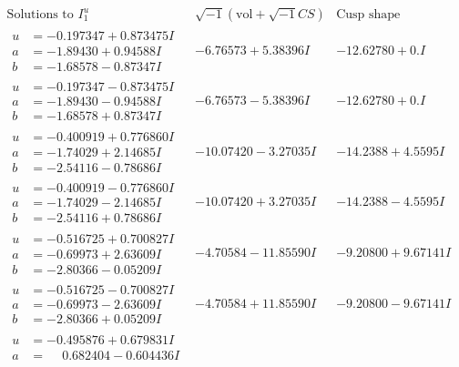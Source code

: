 \documentclass[1p]{elsarticle_modified}
\theoremstyle{definition}
\newcommand{\I}{\sqrt{-1}}
\begin{document}
$$\begin{array}{c|c|c}  
\text{Solutions to }I^u_{1}& \I (\text{vol} + \sqrt{-1}CS) & \text{Cusp shape}\\
 \hline 
\begin{aligned}
u &= -0.197347 + 0.873475 I \\
a &= -1.89430 + 0.94588 I \\
b &= -1.68578 - 0.87347 I\end{aligned}
 & -6.76573 + 5.38396 I & -12.62780 + 0. I\phantom{ +0.000000I} \\ \hline\begin{aligned}
u &= -0.197347 - 0.873475 I \\
a &= -1.89430 - 0.94588 I \\
b &= -1.68578 + 0.87347 I\end{aligned}
 & -6.76573 - 5.38396 I & -12.62780 + 0. I\phantom{ +0.000000I} \\ \hline\begin{aligned}
u &= -0.400919 + 0.776860 I \\
a &= -1.74029 + 2.14685 I \\
b &= -2.54116 - 0.78686 I\end{aligned}
 & -10.07420 - 3.27035 I & -14.2388 + 4.5595 I \\ \hline\begin{aligned}
u &= -0.400919 - 0.776860 I \\
a &= -1.74029 - 2.14685 I \\
b &= -2.54116 + 0.78686 I\end{aligned}
 & -10.07420 + 3.27035 I & -14.2388 - 4.5595 I \\ \hline\begin{aligned}
u &= -0.516725 + 0.700827 I \\
a &= -0.69973 + 2.63609 I \\
b &= -2.80366 - 0.05209 I\end{aligned}
 & -4.70584 - 11.85590 I & -9.20800 + 9.67141 I \\ \hline\begin{aligned}
u &= -0.516725 - 0.700827 I \\
a &= -0.69973 - 2.63609 I \\
b &= -2.80366 + 0.05209 I\end{aligned}
 & -4.70584 + 11.85590 I & -9.20800 - 9.67141 I \\ \hline\begin{aligned}
u &= -0.495876 + 0.679831 I \\
a &= \phantom{-}0.682404 - 0.604436 I \\

\end{aligned}
\end{array}$$
\end{document}

